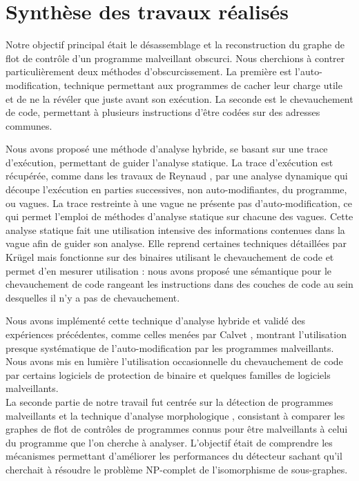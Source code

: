 \section*{Synthèse des travaux réalisés}

Notre objectif principal était le désassemblage et la reconstruction du graphe de flot de contrôle d'un programme malveillant obscurci.
Nous cherchions à contrer particulièrement deux méthodes d'obscurcissement. 
La première est l'auto-modification, technique permettant aux programmes de cacher leur charge utile et de ne la révéler que juste avant son exécution. La seconde est le chevauchement de code, permettant à plusieurs instructions d'être codées sur des adresses communes.

Nous avons proposé une méthode d'analyse hybride, se basant sur une trace d'exécution, permettant de guider l'analyse statique.
La trace d'exécution est récupérée, comme dans les travaux de Reynaud \cite{Reynaud2010}, par une analyse dynamique qui découpe l'exécution en parties successives, non auto-modifiantes, du programme, ou vagues.
La trace restreinte à une vague ne présente pas d'auto-modification, ce qui permet l'emploi de méthodes d'analyse statique sur chacune des vagues.
Cette analyse statique fait une utilisation intensive des informations contenues dans la vague afin de guider son analyse.
Elle reprend certaines techniques détaillées par Krügel \cite{KruegelRVV04} mais fonctionne sur des binaires utilisant le chevauchement de code et permet d'en mesurer utilisation : nous avons proposé une sémantique pour le chevauchement de code rangeant les instructions dans des couches de code au sein desquelles il n'y a pas de chevauchement.

Nous avons implémenté cette technique d'analyse hybride et validé des expériences précédentes, comme celles menées par Calvet  \cite{Calvet2013}, montrant l'utilisation presque systématique de l'auto-modification par les programmes malveillants.
Nous avons mis en lumière l'utilisation occasionnelle du chevauchement de code par certains logiciels de protection de binaire et quelques familles de logiciels malveillants.
\\

La seconde partie de notre travail fut centrée sur la détection de programmes malveillants et la technique d'analyse morphologique \cite{BKM08}, consistant à comparer les graphes de flot de contrôles de programmes connus pour être malveillants à celui du programme que l'on cherche à analyser.
L'objectif était de comprendre les mécanismes permettant d'améliorer les performances du détecteur sachant qu'il cherchait à résoudre le problème NP-complet de l'isomorphisme de sous-graphes.

